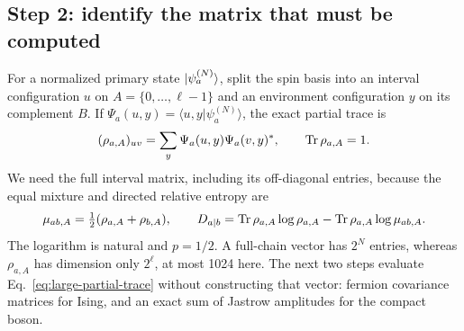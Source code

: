 \subsection{Step 2: identify the matrix that must be computed}
\label{sec:large-target-matrix}
For a normalized primary state $\lvert \psi_a^{(N)}\rangle$, split the spin basis
into an interval configuration $u$ on $A=\{0,\ldots,\ell-1\}$ and an
environment configuration $y$ on its complement $B$. If
$\Psi_a(u,y)=\langle u,y|\psi_a^{(N)}\rangle$, the exact partial trace is
\begin{equation}
 (\rho_{a,A})_{uv}=\sum_y\Psi_a(u,y)\Psi_a(v,y)^*,\qquad
 \operatorname{Tr}\rho_{a,A}=1.
 \label{eq:large-partial-trace}
\end{equation}
We need the full interval matrix, including its off-diagonal entries,
because the equal mixture and directed relative entropy are
\begin{equation}
 \mu_{ab,A}=\tfrac12(\rho_{a,A}+\rho_{b,A}),\qquad
 D_{a\mid b}=\operatorname{Tr}\rho_{a,A}\log\rho_{a,A}
              -\operatorname{Tr}\rho_{a,A}\log\mu_{ab,A}.
 \label{eq:large-target}
\end{equation}
The logarithm is natural and $p=1/2$. A full-chain vector has $2^N$
entries, whereas $\rho_{a,A}$ has dimension only $2^\ell$, at most 1024
here. The next two steps evaluate Eq.~\eqref{eq:large-partial-trace}
without constructing that vector: fermion covariance matrices for Ising,
and an exact sum of Jastrow amplitudes for the compact boson.

